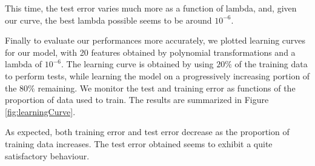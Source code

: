 \documentclass{article} %
\begin{document}
This time, the test error varies much more as a function of lambda, and, given
our curve, the best lambda possible seems to be around $10^{-6}$.

Finally to evaluate our performances more accurately, we plotted learning curves
for our model, with 20 features obtained by polynomial transformations and a
lambda of $10^{-6}$. The learning curve is obtained by using $20\%$ of the
training data to perform tests, while learning the model on a progressively
increasing portion of the $80\%$ remaining. We monitor the test and training
error as functions of the proportion of data used to train. The results are
summarized in Figure \ref{fig:learningCurve}. 

As expected, both training error and test error decrease as the proportion of
training data increases. The test error obtained seems to exhibit a quite
satisfactory behaviour.

\begin{figure}[!h]
\center
{}
\hfill
{}
\caption{}
\end{figure}
\end{document}
